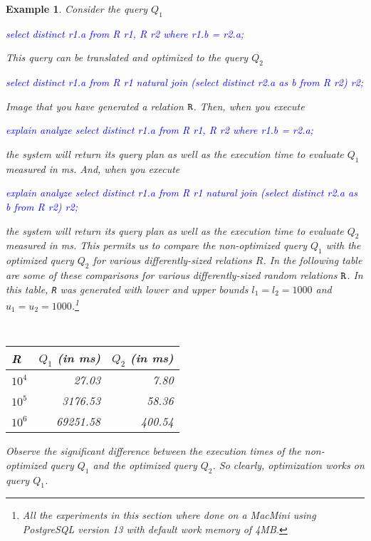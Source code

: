 \documentclass[10pt]{article}
\newtheorem{example}{Example}
\renewenvironment{alltt}{\vspace{-0.75\baselineskip}\begin{oldalltt}}{\end{oldalltt}\vspace{+0.50\baselineskip}}
\begin{document}
\begin{example}\label{queryQ1Q2}
Consider the query $Q_1$
\begin{alltt}\textcolor{blue}{
select distinct r1.a
from   R r1, R r2
where  r1.b = r2.a;}
\end{alltt}
\noindent
This query can be translated and optimized to the query $Q_2$
\begin{alltt}\textcolor{blue}{
select distinct r1.a
from   R r1 natural join (select distinct r2.a as b from R r2) r2;}
\end{alltt}
\noindent
Image that you have generated a relation ${\tt R}$.
Then, when you execute  
\begin{alltt}\textcolor{blue}{
explain analyze
select distinct r1.a
from   R r1, R r2
where  r1.b = r2.a;}
\end{alltt}
\noindent
the system will return its query plan as well as the execution time
to evaluate $Q_1$ measured in ms.
And, when you execute
\begin{alltt}\textcolor{blue}{
explain analyze
select distinct r1.a
from   R r1 natural join (select distinct r2.a as b from R r2) r2;}
\end{alltt}
\noindent
the system will return its query plan as well as the execution time
to evaluate $Q_2$ measured in ms.
This permits us to compare the 
non-optimized query $Q_1$ with the optimized query $Q_2$ 
for various differently-sized relations $R$.
In the following table are some of these comparisons for various differently-sized random relations ${\tt R}$.
In this table, {\tt R} was generated with lower and upper bounds $l_1=l_2=1000$ and $u_1=u_2=1000$.\footnote{
All the experiments in this section where done on a MacMini using PostgreSQL version 13 with default work memory of 4MB.}
\begin{center}
{\tt 
\begin{tabular}{l|r|r}
R & $Q_1$ (in ms) & $Q_2$ (in ms) \\ \hline
$10^4$  &   27.03  &   7.80 \\
$10^5$  & 3176.53 &   58.36 \\
$10^6$  & 69251.58&  400.54 \\
\end{tabular}}
\end{center}
Observe the significant difference between the execution times of the
non-optimized query $Q_1$ and the optimized query $Q_2$.
So clearly, optimization works on query $Q_1$.


\end{example}
\end{document}
